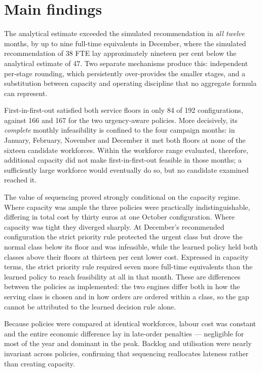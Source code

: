 \section*{Main findings}

The analytical estimate exceeded the simulated recommendation in \emph{all twelve} months, by up
to nine full-time equivalents in December, where the simulated recommendation of 38 FTE lay
approximately nineteen per cent below the analytical estimate of 47. Two separate mechanisms
produce this: independent per-stage rounding, which persistently over-provides the smaller
stages, and a substitution between capacity and operating discipline that no aggregate formula
can represent.

First-in-first-out satisfied both service floors in only 84 of 192 configurations, against 166
and 167 for the two urgency-aware policies. More decisively, its \emph{complete} monthly
infeasibility is confined to the four campaign months: in January, February, November and
December it met both floors at none of the sixteen candidate workforces. Within the workforce
range evaluated, therefore, additional capacity did not make first-in-first-out feasible in
those months; a sufficiently large workforce would eventually do so, but no candidate examined
reached it.

The value of sequencing proved strongly conditional on the capacity regime. Where capacity was
ample the three policies were practically indistinguishable, differing in total cost by thirty
euros at one October configuration. Where capacity was tight they diverged sharply. At
December's recommended configuration the strict priority rule protected the urgent class but
drove the normal class below its floor and was infeasible, while the learned policy held both
classes above their floors at thirteen per cent lower cost. Expressed in capacity terms, the
strict priority rule required seven more full-time equivalents than the learned policy to reach
feasibility at all in that month. These are differences between the policies as implemented: the
two engines differ both in how the serving class is chosen and in how orders are ordered within
a class, so the gap cannot be attributed to the learned decision rule alone.

Because policies were compared at identical workforces, labour cost was constant and the entire
economic difference lay in late-order penalties --- negligible for most of the year and dominant
in the peak. Backlog and utilisation were nearly invariant across policies, confirming that
sequencing reallocates lateness rather than creating capacity.

